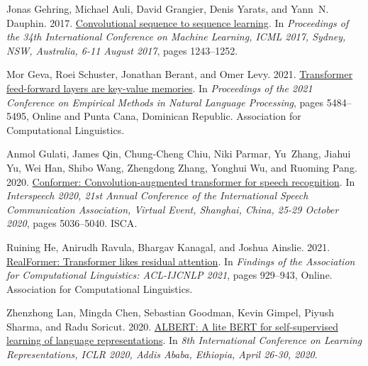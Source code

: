\documentclass[11pt]{article}
\begin{document}
\begin{thebibliography}{49}
Jonas Gehring, Michael Auli, David Grangier, Denis Yarats, and Yann~N. Dauphin. 2017.
\newblock \href {http://proceedings.mlr.press/v70/gehring17a.html} {Convolutional sequence to sequence learning}.
\newblock In \emph{Proceedings of the 34th International Conference on Machine Learning, {ICML} 2017, Sydney, NSW, Australia, 6-11 August 2017}, pages 1243--1252.

Mor Geva, Roei Schuster, Jonathan Berant, and Omer Levy. 2021.
\newblock \href {https://doi.org/10.18653/v1/2021.emnlp-main.446} {Transformer feed-forward layers are key-value memories}.
\newblock In \emph{Proceedings of the 2021 Conference on Empirical Methods in Natural Language Processing}, pages 5484--5495, Online and Punta Cana, Dominican Republic. Association for Computational Linguistics.

Anmol Gulati, James Qin, Chung{-}Cheng Chiu, Niki Parmar, Yu~Zhang, Jiahui Yu, Wei Han, Shibo Wang, Zhengdong Zhang, Yonghui Wu, and Ruoming Pang. 2020.
\newblock \href {https://doi.org/10.21437/Interspeech.2020-3015} {Conformer: Convolution-augmented transformer for speech recognition}.
\newblock In \emph{Interspeech 2020, 21st Annual Conference of the International Speech Communication Association, Virtual Event, Shanghai, China, 25-29 October 2020}, pages 5036--5040. {ISCA}.

Ruining He, Anirudh Ravula, Bhargav Kanagal, and Joshua Ainslie. 2021.
\newblock \href {https://doi.org/10.18653/v1/2021.findings-acl.81} {{R}eal{F}ormer: Transformer likes residual attention}.
\newblock In \emph{Findings of the Association for Computational Linguistics: ACL-IJCNLP 2021}, pages 929--943, Online. Association for Computational Linguistics.

Zhenzhong Lan, Mingda Chen, Sebastian Goodman, Kevin Gimpel, Piyush Sharma, and Radu Soricut. 2020.
\newblock \href {https://openreview.net/forum?id=H1eA7AEtvS} {{ALBERT:} {A} lite {BERT} for self-supervised learning of language representations}.
\newblock In \emph{8th International Conference on Learning Representations, {ICLR} 2020, Addis Ababa, Ethiopia, April 26-30, 2020}.


\end{thebibliography}
\end{document}
